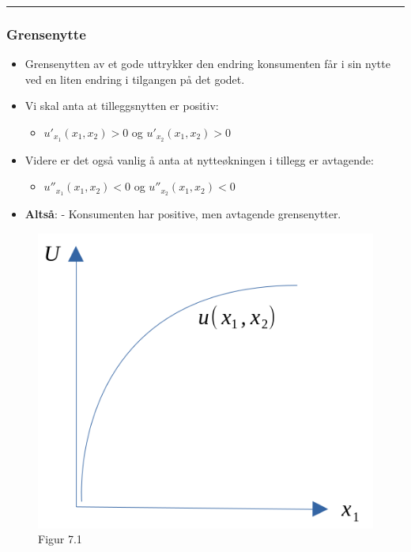 \documentclass[
  letterpaper,
  DIV=11,
  numbers=noendperiod]{scrartcl}
\providecommand{\tightlist}{%
  \setlength{\itemsep}{0pt}\setlength{\parskip}{0pt}}\usepackage{longtable,booktabs,array}
\begin{document}
\begin{center}\rule{0.5\linewidth}{0.5pt}\end{center}

\subsubsection{Grensenytte}\label{grensenytte}

\begin{itemize}
\tightlist
\item
  Grensenytten av et gode uttrykker den endring konsumenten får i sin
  nytte ved en liten endring i tilgangen på det godet.
\item
  Vi skal anta at tilleggsnytten er positiv:

  \begin{itemize}
  \tightlist
  \item
    \(u'_{x_{1}}(x_1,x_2)>0\) og \(u'_{x_{2}}(x_1,x_2)>0\)
  \end{itemize}
\item
  Videre er det også vanlig å anta at nytteøkningen i tillegg er
  avtagende:

  \begin{itemize}
  \tightlist
  \item
    \(u''_{x_{1}}(x_1,x_2)<0\) og \(u''_{x_{2}}(x_1,x_2)<0\)
  \end{itemize}
\item
  \textbf{Altså}: - Konsumenten har positive, men avtagende
  grensenytter.
\end{itemize}

\begin{figure}[H]

{\centering \includegraphics[width=1\textwidth,height=\textheight]{drawio/grensenytte.png}

}

\caption{Figur 7.1}

\end{figure}%
\end{document}
